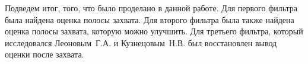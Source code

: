 \documentclass[a4paper,article,14pt]{extarticle}
\begin{document}
Подведем итог, того, что было проделано в данной работе. Для первого фильтра была найдена оценка полосы захвата. Для второго фильтра была также найдена оценка полосы захвата, которую можно улучшить. Для третьего фильтра, который исследовался Леоновым~Г.\:А. и Кузнецовым~Н.\:В. был восстановлен вывод оценки после захвата.
\end{document}
